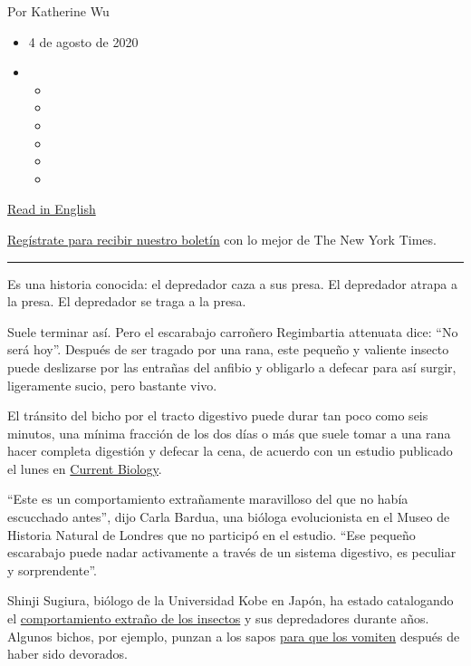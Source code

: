 Por Katherine Wu

\begin{itemize}
\item
  4 de agosto de 2020
\item
  \begin{itemize}
  \item
  \item
  \item
  \item
  \item
  \item
  \end{itemize}
\end{itemize}

\href{https://www.nytimes.com/2020/08/03/science/beetle-frog-poop.html}{Read
in English}

\href{https://www.nytimes.com/newsletters/el-times}{Regístrate para
recibir nuestro boletín} con lo mejor de The New York Times.

\begin{center}\rule{0.5\linewidth}{\linethickness}\end{center}

Es una historia conocida: el depredador caza a sus presa. El depredador
atrapa a la presa. El depredador se traga a la presa.

Suele terminar así. Pero el escarabajo carroñero Regimbartia attenuata
dice: ``No será hoy''. Después de ser tragado por una rana, este pequeño
y valiente insecto puede deslizarse por las entrañas del anfibio y
obligarlo a defecar para así surgir, ligeramente sucio, pero bastante
vivo.

El tránsito del bicho por el tracto digestivo puede durar tan poco como
seis minutos, una mínima fracción de los dos días o más que suele tomar
a una rana hacer completa digestión y defecar la cena, de acuerdo con un
estudio publicado el lunes en
\href{http://dx.doi.org/10.1016/j.cub.2020.06.026}{Current Biology}.

``Este es un comportamiento extrañamente maravilloso del que no había
escucchado antes'', dijo Carla Bardua, una bióloga evolucionista en el
Museo de Historia Natural de Londres que no participó en el estudio.
``Ese pequeño escarabajo puede nadar activamente a través de un sistema
digestivo, es peculiar y sorprendente''.

Shinji Sugiura, biólogo de la Universidad Kobe en Japón, ha estado
catalogando el \href{https://peerj.com/articles/5942/}{comportamiento
extraño de los insectos} y sus depredadores durante años. Algunos
bichos, por ejemplo, punzan a los sapos
\href{https://www.nytimes.com/2018/02/06/science/bombardier-beetle-toad-vomit.html}{para
que los vomiten} después de haber sido devorados.

